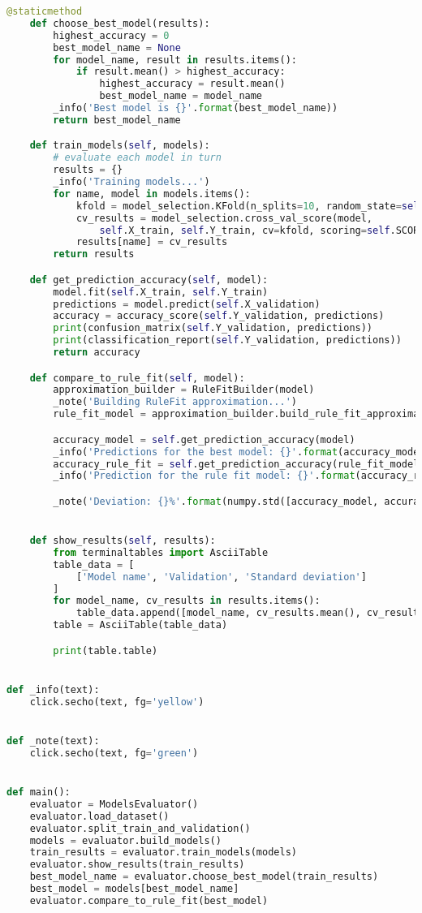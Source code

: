 \documentclass[a4paper,14pt]{extarticle}
\begin{document}
\begin{lstlisting}[language=Python, caption=Побудова базових моделей та вибір найкращої з них]
    @staticmethod
    def choose_best_model(results):
        highest_accuracy = 0
        best_model_name = None
        for model_name, result in results.items():
            if result.mean() > highest_accuracy:
                highest_accuracy = result.mean()
                best_model_name = model_name
        _info('Best model is {}'.format(best_model_name))
        return best_model_name

    def train_models(self, models):
        # evaluate each model in turn
        results = {}
        _info('Training models...')
        for name, model in models.items():
            kfold = model_selection.KFold(n_splits=10, random_state=self.SEED)
            cv_results = model_selection.cross_val_score(model,
                self.X_train, self.Y_train, cv=kfold, scoring=self.SCORING)
            results[name] = cv_results
        return results

    def get_prediction_accuracy(self, model):
        model.fit(self.X_train, self.Y_train)
        predictions = model.predict(self.X_validation)
        accuracy = accuracy_score(self.Y_validation, predictions)
        print(confusion_matrix(self.Y_validation, predictions))
        print(classification_report(self.Y_validation, predictions))
        return accuracy

    def compare_to_rule_fit(self, model):
        approximation_builder = RuleFitBuilder(model)
        _note('Building RuleFit approximation...')
        rule_fit_model = approximation_builder.build_rule_fit_approximation()

        accuracy_model = self.get_prediction_accuracy(model)
        _info('Predictions for the best model: {}'.format(accuracy_model))
        accuracy_rule_fit = self.get_prediction_accuracy(rule_fit_model)
        _info('Prediction for the rule fit model: {}'.format(accuracy_rule_fit))

        _note('Deviation: {}%'.format(numpy.std([accuracy_model, accuracy_rule_fit])))


    def show_results(self, results):
        from terminaltables import AsciiTable
        table_data = [
            ['Model name', 'Validation', 'Standard deviation']
        ]
        for model_name, cv_results in results.items():
            table_data.append([model_name, cv_results.mean(), cv_results.std()])
        table = AsciiTable(table_data)

        print(table.table)


def _info(text):
    click.secho(text, fg='yellow')


def _note(text):
    click.secho(text, fg='green')


def main():
    evaluator = ModelsEvaluator()
    evaluator.load_dataset()
    evaluator.split_train_and_validation()
    models = evaluator.build_models()
    train_results = evaluator.train_models(models)
    evaluator.show_results(train_results)
    best_model_name = evaluator.choose_best_model(train_results)
    best_model = models[best_model_name]
    evaluator.compare_to_rule_fit(best_model)
\end{lstlisting}
\end{document}
